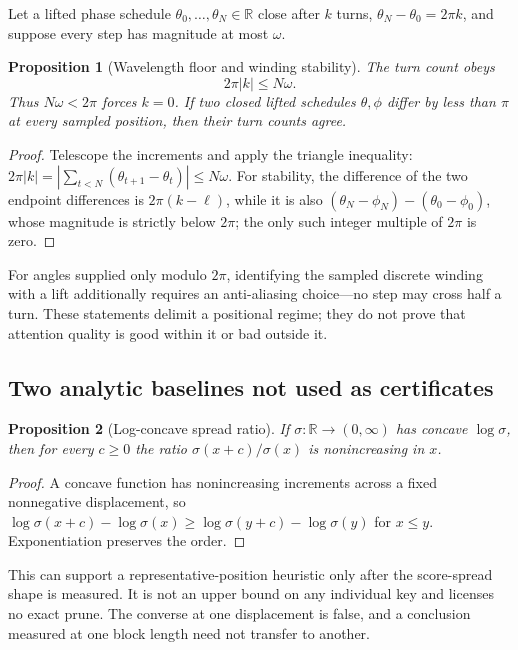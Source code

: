 \documentclass[11pt]{article}
\numberwithin{equation}{section}
\newtheorem{proposition}{Proposition}
\newcommand{\R}{\mathbb{R}}
\begin{document}
Let a lifted phase schedule $\theta_0,\ldots,\theta_N\in\R$ close after $k$ turns,
$\theta_N-\theta_0=2\pi k$, and suppose every step has magnitude at most $\omega$.

\begin{proposition}[Wavelength floor and winding stability]\label{prop:app-winding}
The turn count obeys
\begin{equation}\label{eq:app-winding}
2\pi|k|\le N\omega.
\end{equation}
Thus $N\omega<2\pi$ forces $k=0$. If two closed lifted schedules $\theta,\phi$ differ by less than $\pi$ at
every sampled position, then their turn counts agree.
\end{proposition}
\begin{proof}
Telescope the increments and apply the triangle inequality:
$2\pi|k|=|\sum_{t<N}(\theta_{t+1}-\theta_t)|\le N\omega$. For stability, the difference of the two endpoint
differences is $2\pi(k-\ell)$, while it is also
$(\theta_N-\phi_N)-(\theta_0-\phi_0)$, whose magnitude is strictly below $2\pi$; the only such integer multiple
of $2\pi$ is zero.
\end{proof}

For angles supplied only modulo $2\pi$, identifying the sampled discrete winding with a lift additionally
requires an anti-aliasing choice---no step may cross half a turn. These statements delimit a positional
regime; they do not prove that attention quality is good within it or bad outside it.

\subsection{Two analytic baselines not used as certificates}

\begin{proposition}[Log-concave spread ratio]\label{prop:app-log-concave}
If $\sigma:\R\to(0,\infty)$ has concave $\log\sigma$, then for every $c\ge0$ the ratio
$\sigma(x+c)/\sigma(x)$ is nonincreasing in $x$.
\end{proposition}
\begin{proof}
A concave function has nonincreasing increments across a fixed nonnegative displacement, so
$\log\sigma(x+c)-\log\sigma(x)\ge\log\sigma(y+c)-\log\sigma(y)$ for $x\le y$. Exponentiation preserves the
order.
\end{proof}

This can support a representative-position heuristic only after the score-spread shape is measured. It is
not an upper bound on any individual key and licenses no exact prune. The converse at one displacement is
false, and a conclusion measured at one block length need not transfer to another.
\end{document}
